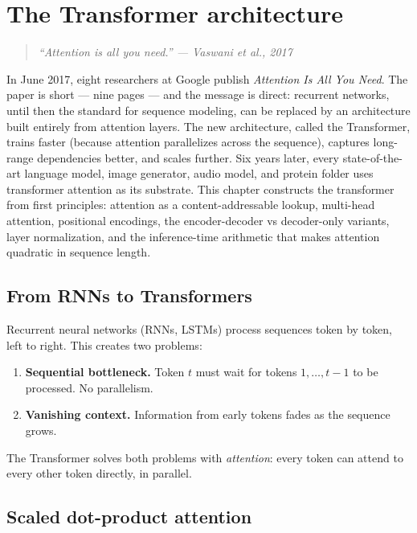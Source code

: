 \chapter{The Transformer architecture}
\label{ch:transformers}

\begin{quote}
\emph{``Attention is all you need.'' --- Vaswani et al., 2017}
\end{quote}

In June 2017, eight researchers at Google publish \emph{Attention Is All You Need}. The paper is short --- nine pages --- and the message is direct: recurrent networks, until then the standard for sequence modeling, can be replaced by an architecture built entirely from attention layers. The new architecture, called the Transformer, trains faster (because attention parallelizes across the sequence), captures long-range dependencies better, and scales further. Six years later, every state-of-the-art language model, image generator, audio model, and protein folder uses transformer attention as its substrate. This chapter constructs the transformer from first principles: attention as a content-addressable lookup, multi-head attention, positional encodings, the encoder-decoder vs decoder-only variants, layer normalization, and the inference-time arithmetic that makes attention quadratic in sequence length.

\section{From RNNs to Transformers}

Recurrent neural networks (RNNs, LSTMs) process sequences token by token, left to right. This creates two problems:
\begin{enumerate}
  \item \textbf{Sequential bottleneck.} Token $t$ must wait for tokens $1, \ldots, t-1$ to be processed. No parallelism.
  \item \textbf{Vanishing context.} Information from early tokens fades as the sequence grows.
\end{enumerate}

The Transformer solves both problems with \emph{attention}: every token can attend to every other token directly, in parallel.

\section{Scaled dot-product attention}

